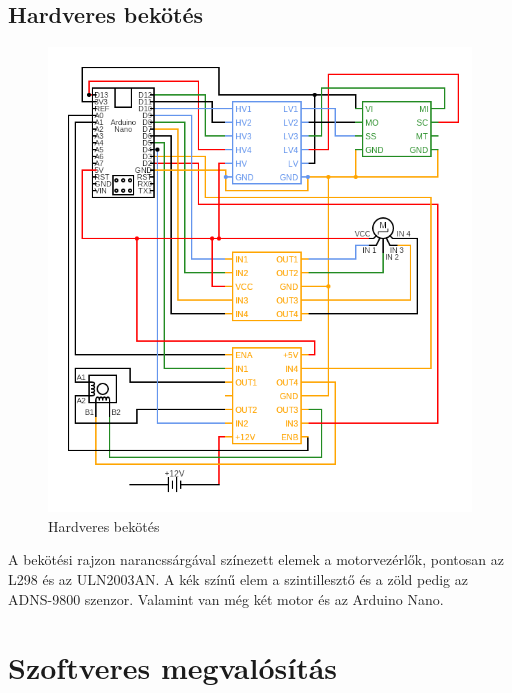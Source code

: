 \documentclass[]{thesis-ekf}
\theoremstyle{definition}
\theoremstyle{remark}
\begin{document}
\section{Hardveres bekötés}
\begin{figure}[th!]
	\centering
	\includegraphics[width=0.8\linewidth]{circuit}
	\caption[Hardveres bekötés]{Hardveres bekötés}
	\label{fig:circuit}
\end{figure}
A bekötési rajzon narancssárgával színezett elemek a motorvezérlők, pontosan az L298 és az ULN2003AN. A kék színű elem a szintillesztő és a zöld pedig az ADNS-9800 szenzor. Valamint van még két motor és az Arduino Nano.

\chapter{Szoftveres megvalósítás}

\end{document}
